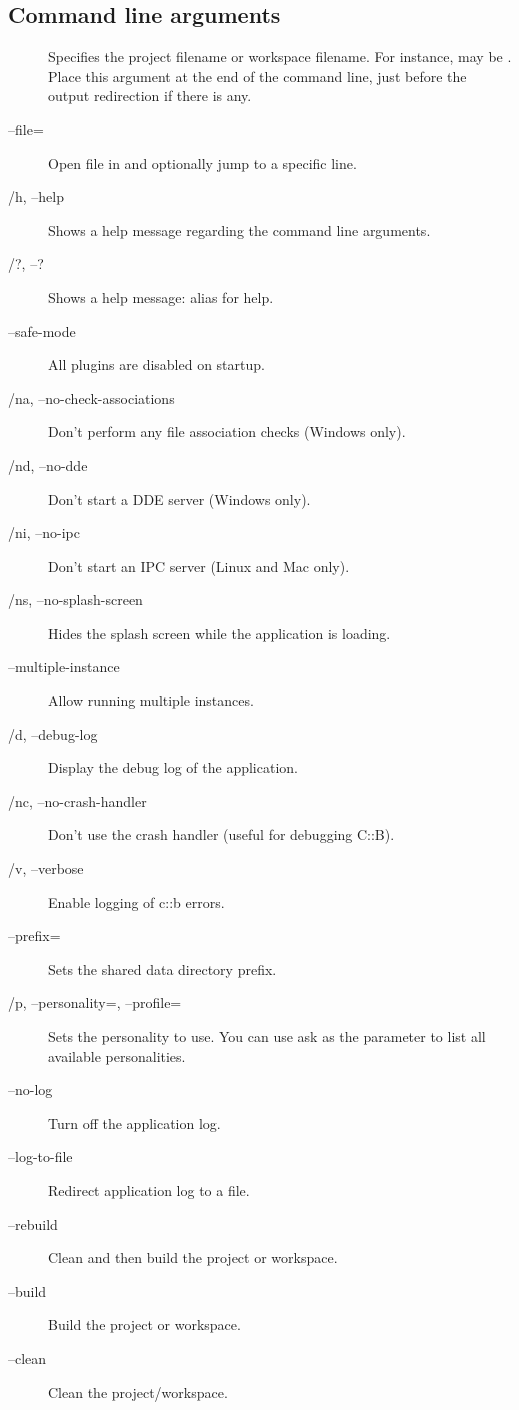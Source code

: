 \subsection{Command line arguments}
\begin{description}
\item[] Specifies the project  filename or workspace  filename. For instance,  may be . Place this argument at the end of the command line, just before the output redirection if there is any.
\item[--file=] Open file in \codeblocks and optionally jump to a specific line.
\item[/h, --help] Shows a help message regarding the command line arguments.
\item[/?, --?] Shows a help message: alias for help.
\item[--safe-mode] All plugins are disabled on startup.
\item[/na, --no-check-associations] Don't perform any file association checks (Windows only).
\item[/nd, --no-dde] Don't start a DDE server (Windows only).
\item[/ni, --no-ipc] Don't start an IPC server (Linux and Mac only).
\item[/ns, --no-splash-screen] Hides the splash screen while the application is loading.
\item[--multiple-instance] Allow running multiple instances.
\item[/d, --debug-log] Display the debug log of the application.
\item[/nc, --no-crash-handler] Don't use the crash handler (useful for debugging C::B).
\item[/v, --verbose] Enable logging of c::b errors.
\item[--prefix=] Sets the shared data directory prefix.
\item[/p, --personality=, --profile=] Sets the personality to use. You can use ask as the parameter to list all available personalities.
\item[--no-log] Turn off the application log.
\item[--log-to-file] Redirect application log to a file.
\item[--rebuild] Clean and then build the project or workspace.
\item[--build] Build the project or workspace.
\item[--clean] Clean the project/workspace.

\end{description}
